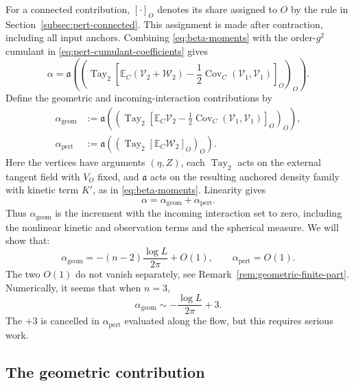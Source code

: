 \documentclass[11pt]{article}
\newcommand{\E}{\mathbb E}
\newcommand{\Tay}{\operatorname{Tay}}
\newcommand{\red}{\color{red}}
\numberwithin{equation}{section}
\theoremstyle{definition}
\theoremstyle{plain}
\begin{document}
For a connected contribution, $[\cdot]_O$ denotes its share
assigned to $O$ by the rule in Section~\ref{subsec:pert-connected}.
This assignment is made after contraction, including all input
anchors.  Combining \eqref{eq:beta-moments} with the
order-$g^2$ cumulant in \eqref{eq:pert-cumulant-coefficients} gives
\begin{equation}
 \alpha=\mathfrak a\left(
   \left(\Tay_2\left[
      \E_C(\mathcal V_2+\mathcal W_2)
      -\frac12\operatorname{Cov}_C(\mathcal V_1,\mathcal V_1)
   \right]_O\right)_O\right).
 \label{eq:alpha-derivative-formula}
\end{equation}
Define the geometric and incoming-interaction contributions by
\begin{align}
 \alpha_{\mathrm{geom}}
   &:=\mathfrak a\left(
       \left(\Tay_2\left[
          \E_C\mathcal V_2
          -\frac12\operatorname{Cov}_C(\mathcal V_1,\mathcal V_1)
       \right]_O\right)_O\right),
       \label{eq:alpha-geom-definition}\\
 \alpha_{\mathrm{pert}}
   &:=\mathfrak a\left(
       \left(\Tay_2[\E_C\mathcal W_2]_O\right)_O\right).
 \label{eq:alpha-geometric-incoming}
\end{align}
Here the vertices have arguments $(\eta,Z)$, each $\Tay_2$
acts on the external tangent field with $V_O$ fixed, and
$\mathfrak a$ acts on the resulting anchored density family
with kinetic term $K'$, as in \eqref{eq:beta-moments}.
Linearity gives
\begin{equation}
 \alpha=\alpha_{\mathrm{geom}}+\alpha_{\mathrm{pert}}.
 \label{eq:alpha-splitting}
\end{equation}
Thus $\alpha_{\mathrm{geom}}$ is the increment with the incoming
interaction set to zero, including the nonlinear kinetic and
observation terms and the spherical measure. We will show that:
\begin{equation}
 \alpha_{\mathrm{geom}}
   =-(n-2)\frac{\log L}{2\pi}+O(1),
   \qquad
 \alpha_{\mathrm{pert}}
  = O(1).
\end{equation}
{\red The two $O(1)$ do not vanish separately,
see Remark~\ref{rem:geometric-finite-part}.
Numerically, it seems that when $n=3$,
\begin{equation}
 \alpha_{\mathrm{geom}}
   \sim -\frac{\log L}{2\pi}+3.
\end{equation}
The $+3$ is cancelled in $\alpha_{\mathrm{pert}}$ evaluated along the flow,
but this requires serious work.
}


\subsection{The geometric contribution}
\end{document}
